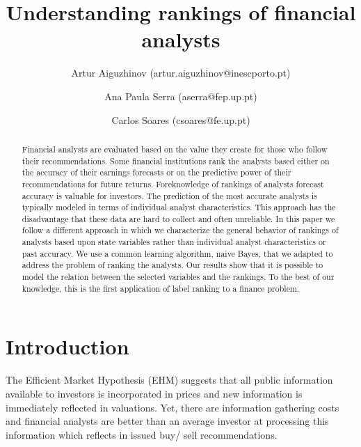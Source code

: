 \documentclass{article}\usepackage[]{graphicx}\usepackage[]{color}
\begin{document}
\title{Understanding rankings of financial analysts}


 \author[1,2]{ Artur Aiguzhinov (artur.aiguzhinov@inescporto.pt)}
   \author[1]{
   Ana Paula Serra (aserra@fep.up.pt)}

\author[2,3]{
   Carlos Soares (csoares@fe.up.pt)}




        

\maketitle
\begin{abstract}

Financial analysts are evaluated based on the value they create for those who follow their recommendations. Some financial institutions rank the analysts based either on the accuracy of their earnings forecasts or on the predictive power of their recommendations for future returns. Foreknowledge of rankings of analysts forecast accuracy is valuable for investors. The prediction of the most accurate analysts is typically modeled in terms of individual analyst characteristics. This approach has the disadvantage that these data are hard to collect and often unreliable. In this paper we follow a different approach in which we characterize the general behavior of rankings of analysts based upon state variables rather than individual analyst characteristics or past accuracy. We use a common learning algorithm, naive Bayes, that we adapted to address the problem of ranking the analysts.  Our results show that it is possible to model the relation between the selected variables and the rankings. To the best of our knowledge, this is the first application of label ranking to a finance problem. 
\end{abstract}

\section{Introduction}
\label{sec:introduction}

The Efficient Market Hypothesis (EHM) \citep{fama1970ecm} suggests that all public information available to investors is incorporated in prices and new information is immediately reflected in valuations. Yet, there are information gathering costs and financial analysts are better than an average investor at processing this information which reflects in issued buy/ sell recommendations. 
\end{document}
